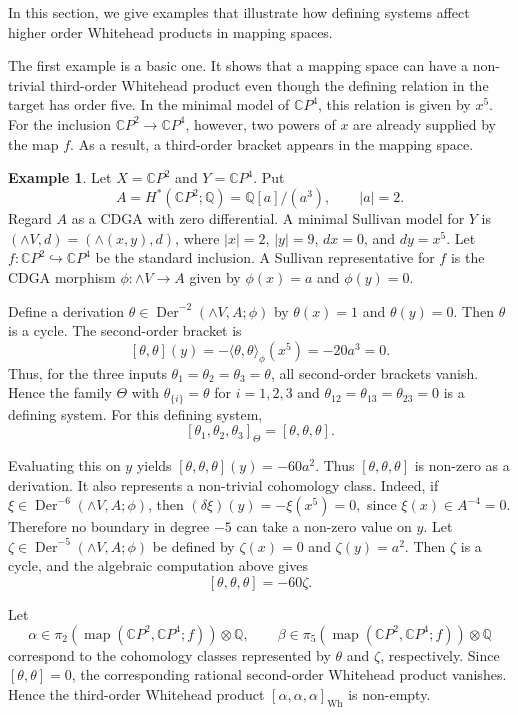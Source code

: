 \documentclass[a4paper,10pt]{amsart}
\theoremstyle{definition}
\newtheorem{ex}[thm]{Example}
\theoremstyle{remark}
\newcommand{\map}{\operatorname{map}}
\newcommand{\Der}{\operatorname{Der}}
\numberwithin{equation}{section}
\begin{document}
In this section, we give examples that illustrate how defining systems affect
higher order Whitehead products in mapping spaces.

The first example is a basic one. It shows that a mapping space can have a
non-trivial third-order Whitehead product even though the defining relation in
the target has order five. In the minimal model of $\mathbb{C}P^4$, this
relation is given by $x^5$. For the inclusion
$\mathbb{C}P^2\to \mathbb{C}P^4$, however, two powers of $x$ are already
supplied by the map $f$. As a result, a third-order bracket appears in the
mapping space.


\begin{ex}\label{ex:cp2-cp4-inclusion}
Let $X=\mathbb{C}P^2$ and $Y=\mathbb{C}P^4$.
Put
\[
        A=H^*(\mathbb{C}P^2;\mathbb{Q})
        =\mathbb{Q}[a]/(a^3),
        \qquad |a|=2.
\]
Regard $A$ as a CDGA with zero differential.
A minimal Sullivan model for $Y$ is
$(\wedge V,d)=(\wedge(x,y),d)$, where
$|x|=2$, $|y|=9$, $dx=0$, and $dy=x^5$.
Let $f:\mathbb{C}P^2\hookrightarrow \mathbb{C}P^4$ be the standard inclusion.
A Sullivan representative for $f$ is the CDGA morphism
$\phi:\wedge V\to A$ given by $\phi(x)=a$ and $\phi(y)=0$.

Define a derivation $\theta\in \Der^{-2}(\wedge V,A;\phi)$ by
$\theta(x)=1$ and $\theta(y)=0$. Then $\theta$ is a cycle.
The second-order bracket is
\[
[\theta,\theta](y)
=
-\langle \theta,\theta\rangle_\phi(x^5)
=
-20 a^3
=
0.
\]
Thus, for the three inputs
$\theta_1=\theta_2=\theta_3=\theta$, all second-order brackets vanish.
Hence the family $\Theta$ with $\theta_{\{i\}}=\theta$ for $i=1,2,3$ and
$\theta_{12}=\theta_{13}=\theta_{23}=0$ is a defining system.
For this defining system,
\[
[\theta_1,\theta_2,\theta_3]_\Theta
=
[\theta,\theta,\theta].
\]

Evaluating this on $y$ yields
$
[\theta,\theta,\theta](y)=-60a^2.
$
Thus $[\theta,\theta,\theta]$ is non-zero as a derivation.
It also represents a non-trivial cohomology class. Indeed, if
$\xi\in \Der^{-6}(\wedge V,A;\phi)$, then
$
(\delta\xi)(y)=-\xi(x^5)=0,
$
since $\xi(x)\in A^{-4}=0$.
Therefore no boundary in degree $-5$ can take a non-zero value on $y$.
Let $\zeta \in \Der^{-5}(\wedge V,A;\phi)$ be defined by
$\zeta(x)=0$ and $\zeta(y)=a^2$. Then $\zeta$ is a cycle, and the algebraic computation
above gives
\[
        [\theta,\theta,\theta]=-60\zeta.
\]

Let
\[
\alpha \in \pi_2(\map(\mathbb{C}P^2,\mathbb{C}P^4;f))\otimes\mathbb{Q},
\qquad
\beta \in \pi_5(\map(\mathbb{C}P^2,\mathbb{C}P^4;f))\otimes\mathbb{Q}
\]
correspond to the cohomology classes represented by $\theta$ and $\zeta$, respectively.
Since $[\theta,\theta]=0$, the corresponding rational second-order Whitehead
product vanishes. Hence the third-order Whitehead product
$[\alpha,\alpha,\alpha]_{\mathrm{Wh}}$ is non-empty.


\end{ex}
\end{document}
